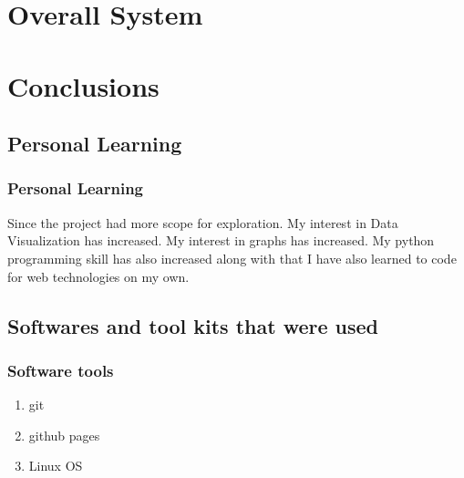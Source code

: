 \documentclass{beamer}
\begin{document}
\section{Overall System}

\section{Conclusions}

\subsection{Personal Learning}
\frame
{
	\frametitle{Personal Learning}
Since the project had more scope for exploration.
My interest in Data Visualization has increased.
My interest in graphs has increased.
My python programming skill has also increased along with that I have also learned to code for web technologies on my own.
}

\subsection{Softwares and tool kits that were used}

\frame
{
	\frametitle{Software tools}
	\begin{enumerate}
		\item git
		\item github pages
		\item Linux OS
	\end{enumerate}
}
\end{document}
